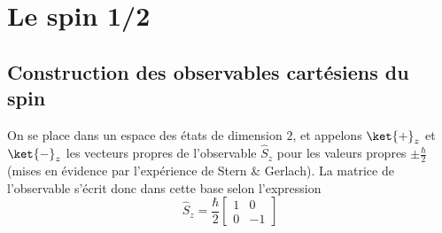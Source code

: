 \section{Le spin 1/2}

    \subsection{Construction des observables cartésiens du spin}

        On se place dans un espace des états de dimension $2$, et appelons $\ket{+}_z$ et $\ket{-}_z$ les vecteurs propres de l’observable $\hat{S}_z$ pour les valeurs propres $\pm \frac{\hbar}{2}$ (mises en évidence par l’expérience de Stern \& Gerlach). La matrice de l’observable s’écrit donc dans cette base selon l’expression 
        \[ \hat{S}_z = \frac{\hbar}{2} \begin{bmatrix}
            1 & 0 \\
            0 & -1
        \end{bmatrix} \]


